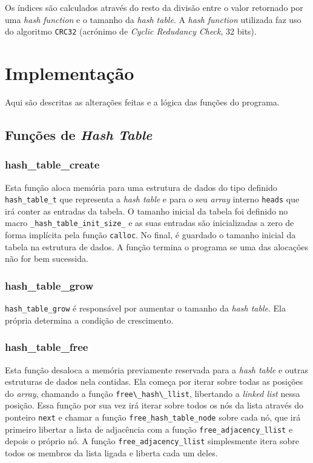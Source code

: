 \documentclass[portuguese,11pt,a4paper,titlepage]{article}
\newcommand{\foreign}[1]{\textit{#1}}
\begin{document}
Os índices são calculados através do resto da divisão entre o valor retornado por uma \textit{hash function} e o tamanho da \textit{hash table}. A \textit{hash function} utilizada faz uso do algoritmo \lstinline|CRC32| (acrónimo de \textit{Cyclic Redudancy Check}, 32 bits).

\section{Implementação}
Aqui são descritas as alterações feitas e a lógica das funções do programa.

\subsection{Funções de \textit{Hash Table}}

\subsubsection{hash\_table\_create}
Esta função aloca memória para uma estrutura de dados do tipo definido \verb|hash_table_t| que
representa a \foreign{hash table} e para o seu \foreign{array} interno \verb|heads| que irá
conter as entradas da tabela. O tamanho inicial da tabela foi definido no macro
\verb|_hash_table_init_size_| e as suas entradas são inicializadas a zero de forma implícita pela
função \verb|calloc|. No final, é guardado o tamanho inicial da tabela na estrutura de dados. A função termina o programa se uma das alocações não for bem sucessida.

\subsubsection{hash\_table\_grow}
\verb|hash_table_grow| é responsável por aumentar o tamanho da \foreign{hash table}. Ela própria determina a condição de crescimento.
\subsubsection{hash\_table\_free}
Esta função desaloca a memória previamente reservada para a \foreign{hash table} e outras
estruturas de dados nela contidas. Ela começa por iterar sobre todas as posições do \foreign{array}, chamando a função \verb|free\_hash\_llist|, libertando a \foreign{linked list} nessa posição. Essa função por sua vez irá iterar sobre todos os nós da lista através
do ponteiro \verb|next| e chamar a função \verb|free_hash_table_node| sobre cada nó, que irá primeiro libertar a lista de adjacência com a função \verb|free_adjacency_llist| e depois o próprio nó. A função \verb|free_adjacency_llist| simplesmente itera sobre todos
os membros da lista ligada e liberta cada um deles.
\end{document}
